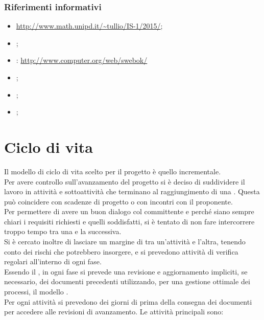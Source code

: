 \documentclass[a4paper, titlepage]{article}
\begin{document}
\subsubsection{Riferimenti informativi}
\begin{itemize}
	\item {} \url{http://www.math.unipd.it/~tullio/IS-1/2015/};
	\item {};
	\item {}: \url{http://www.computer.org/web/swebok/}
	\item {} ;
	\item {} ;
	\item {} ;	
\end{itemize}

\newpage
\section{Ciclo di vita}\label{Ciclo di vita}
Il modello di ciclo di vita scelto per il progetto è quello incrementale.\\
Per avere controllo sull'avanzamento del progetto si è deciso di suddividere il lavoro in attività e sottoattività che terminano al raggiungimento di una . Questa  può coincidere con scadenze di progetto o con incontri con il proponente.\\
Per permettere di avere un buon dialogo col committente e perché siano sempre chiari i requisiti richiesti e quelli soddisfatti, si è tentato di non fare intercorrere troppo tempo tra una  e la successiva.\\
Si è cercato inoltre di lasciare un margine di  tra un'attività e l'altra, tenendo conto dei rischi che potrebbero insorgere, e si prevedono attività di verifica regolari all'interno di ogni fase.\\
Essendo il , in ogni fase si prevede una revisione e aggiornamento impliciti, se necessario, dei documenti precedenti utilizzando, per una gestione ottimale dei processi, il modello .\\
Per ogni attività si prevedono dei giorni di  prima della consegna dei documenti per accedere alle revisioni di avanzamento.
Le attività principali sono:
\end{document}
